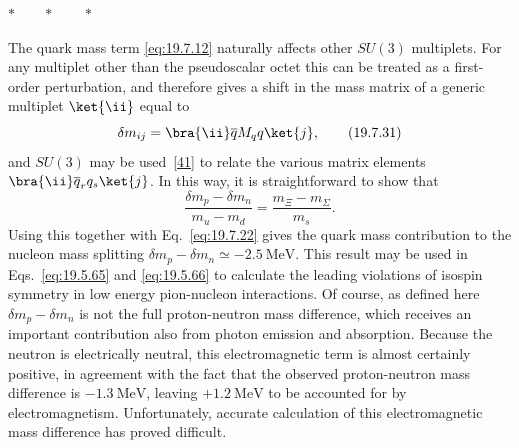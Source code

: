 \begin{center}
$* \qquad * \qquad *$
\end{center}

The quark mass term \eqref{eq:19.7.12} naturally affects other $SU(3)$ multiplets. For any multiplet other than the pseudoscalar octet this can be treated as a first-order perturbation, and therefore gives a shift in the mass matrix of a generic multiplet $\ket{\ii}$ equal to
\begin{equation}
\delta m_{ij}
=\bra{\ii}\overline qM_qq\ket{j},
\tag{19.7.31}\label{eq:19.7.31}
\end{equation}
and $SU(3)$ may be used~\hyperref[ch19-ref-41]{[41]} to relate the various matrix elements $\bra{\ii}\overline q_rq_s\ket{j}$. In this way, it is straightforward to show that
\begin{equation}
\frac{\delta m_p-\delta m_n}{m_u-m_d}
=\frac{m_\Xi-m_\Sigma}{m_s}.
\tag{19.7.32}\label{eq:19.7.32}
\end{equation}
Using this together with Eq.~\eqref{eq:19.7.22} gives the quark mass contribution to the nucleon mass splitting $\delta m_p-\delta m_n\simeq-2.5\ \mathrm{MeV}$. This result may be used in Eqs.~\eqref{eq:19.5.65} and \eqref{eq:19.5.66} to calculate the leading violations of isospin symmetry in low energy pion-nucleon interactions. Of course, as defined here $\delta m_p-\delta m_n$ is not the full proton-neutron mass difference, which receives an important contribution also from photon emission and absorption. Because the neutron is electrically neutral, this electromagnetic term is almost certainly positive, in agreement with the fact that the observed proton-neutron mass difference is $-1.3\ \mathrm{MeV}$, leaving $+1.2\ \mathrm{MeV}$ to be accounted for by electromagnetism. Unfortunately, accurate calculation of this electromagnetic mass difference has proved difficult.
